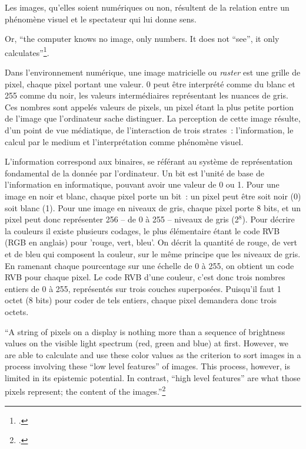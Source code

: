 Les images, qu'elles soient numériques ou non, résultent de la relation
entre un phénomène visuel et le spectateur qui lui donne sens.

Or, ``the computer knows no image, only numbers. It does not ``see'', it
only calculates''\footcite[p.21]{klinke_big_2016}.

Dans l'environnement numérique, une image matricielle ou \textit{raster} est une
grille de pixel, chaque pixel portant une valeur. 0 peut être interprété
comme du blanc et 255 comme du noir, les valeurs intermédiaires
représentant les nuances de gris. Ces nombres sont appelés valeurs de
pixels, un pixel étant la plus petite portion de l'image que
l'ordinateur sache distinguer. La perception de cette image résulte,
d'un point de vue médiatique, de l'interaction de trois strates~:
l'information, le calcul par le medium et l'interprétation comme
phénomène visuel.

L'information correspond aux binaires, se référant au système de
représentation fondamental de la donnée par l'ordinateur. Un bit est
l'unité de base de l'information en informatique, pouvant avoir une
valeur de 0 ou 1. Pour une image en noir et blanc, chaque pixel porte un
bit~: un pixel peut être soit noir (0) soit blanc (1). Pour une image en
niveaux de gris, chaque pixel porte 8 bits, et un pixel peut donc
représenter 256 -- de 0 à 255 -- niveaux de gris (2$^8$). Pour décrire la
couleurs il existe plusieurs codages, le plus élémentaire étant le code
RVB (RGB en anglais) pour 'rouge, vert, bleu'. On décrit la quantité
de rouge, de vert et de bleu qui composent la couleur, sur le même
principe que les niveaux de gris. En ramenant chaque pourcentage sur une
échelle de 0 à 255, on obtient un code RVB pour chaque pixel. Le code
RVB d'une couleur, c'est donc trois nombres entiers de 0 à 255,
représentés sur trois couches superposées. Puisqu'il faut 1 octet (8
bits) pour coder de tels entiers, chaque pixel demandera donc trois
octets.

\begin{kwote}                     
``A string of pixels on a display is nothing more than a sequence of
brightness values on the visible light spectrum (red, green and blue) at
first. However, we are able to calculate and use these color values as
the criterion to sort images in a process involving these ``low level
features'' of images. This process, however, is limited in its epistemic
potential. In contrast, ``high level features'' are what those pixels
represent; the content of the images.''\footcite[p.17]{klinke_big_2016}
                 \end{kwote}     

